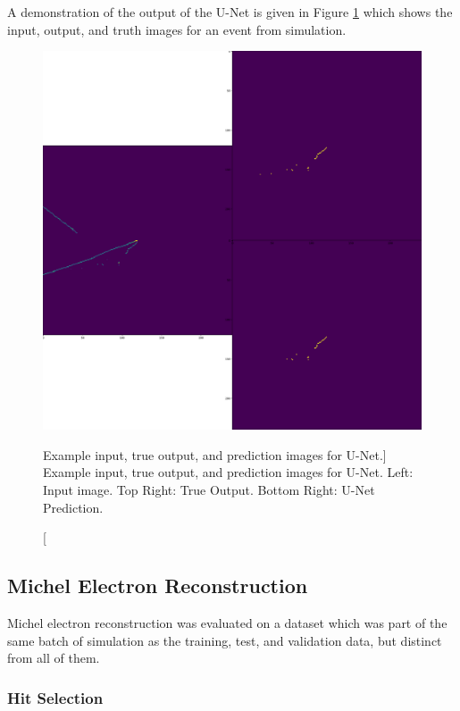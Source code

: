 A demonstration of the output of the U-Net is given in Figure 
\ref{fig:unet_example} which shows the input, output, and truth images for an 
event from \protodune{} simulation.
\begin{figure}
	\centering
	\includegraphics[width=\textwidth]{figures/unet_example.pdf}
	\caption
	[Example input, true output, and prediction images for U-Net.]
	{Example input, true output, and prediction images for U-Net. Left: Input
	image. Top Right: True Output. Bottom Right: U-Net Prediction.}
	\label{fig:unet_example}
\end{figure}

\subsection{Michel Electron Reconstruction}

Michel electron reconstruction was evaluated on a dataset which was part of the 
same batch of simulation as the training, test, and validation data, but
distinct from all of them. 

\subsubsection{Hit Selection}

